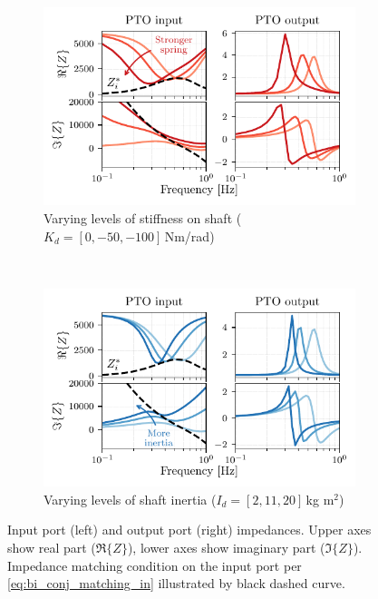 \documentclass[twocolumn]{autart}
\begin{document}
\begin{figure}
     \centering
     \begin{subfigure}[b]{1\columnwidth}
         \centering
         \includegraphics[width=\textwidth]{wec_as_multiport_in_and_out_impedances_spring.pdf}
         \caption{Varying levels of stiffness on shaft ($K_d=[0, -50, -100]$\,Nm/rad)}
         \label{fig:wec_as_multiport_in_and_out_impedances_spring}
     \end{subfigure}
     \\
     \begin{subfigure}[b]{1\columnwidth}
         \centering
         \includegraphics[width=\textwidth]{wec_as_multiport_in_and_out_impedances_inertia.pdf}
         \caption{Varying levels of shaft inertia ($I_d=[2, 11, 20]$\,kg m$^2$)}
         \label{fig:wec_as_multiport_in_and_out_impedances_inertia}
     \end{subfigure}
     \caption{Input port (left) and output port (right) impedances. Upper axes show real part ($\Re \{ Z \}$), lower axes show imaginary part ($\Im \{ Z \}$). Impedance matching condition on the input port per \eqref{eq:bi_conj_matching_in} illustrated by black dashed curve.}
     \label{fig:wec_as_multiport_in_and_out_impedances}
\end{figure}
\end{document}
